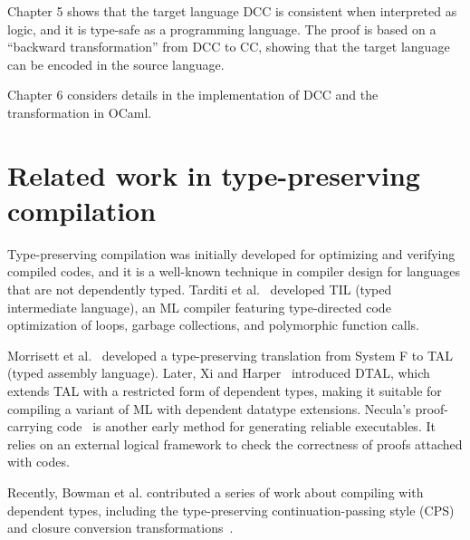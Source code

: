 Chapter 5 shows that the target language DCC is consistent when interpreted as logic, and it is type-safe as a programming language. The proof is based on a ``backward transformation'' from DCC to CC, showing that the target language can be encoded in the source language.

Chapter 6 considers details in the implementation of DCC and the transformation in OCaml.

\section{Related work in type-preserving \\compilation}

Type-preserving compilation was initially developed for optimizing and verifying compiled codes, and it is a well-known technique in compiler design for languages that are not dependently typed. Tarditi et al.~\cite{DBLP:conf/pldi/TarditiMCSHL96} developed TIL (typed intermediate language), an ML compiler featuring type-directed code optimization of loops, garbage collections, and polymorphic function calls. 

Morrisett et al.~\cite{DBLP:journals/toplas/MorrisettWCG99} developed a type-preserving translation from System F to TAL (typed assembly language). Later, Xi and Harper~\cite{DBLP:conf/icfp/XiH01} introduced DTAL, which extends TAL with a restricted form of dependent types, making it suitable for compiling a variant of ML with dependent datatype extensions. Necula’s proof-carrying code~\cite{DBLP:conf/popl/Necula97} is another early method for generating reliable executables. It relies on an external logical framework to check the correctness of proofs attached with codes.

Recently, Bowman et al. contributed a series of work about compiling with dependent types, including the type-preserving continuation-passing style (CPS) and closure conversion transformations~\cite{DBLP:journals/pacmpl/BowmanCRA18,DBLP:conf/pldi/BowmanA18}.


